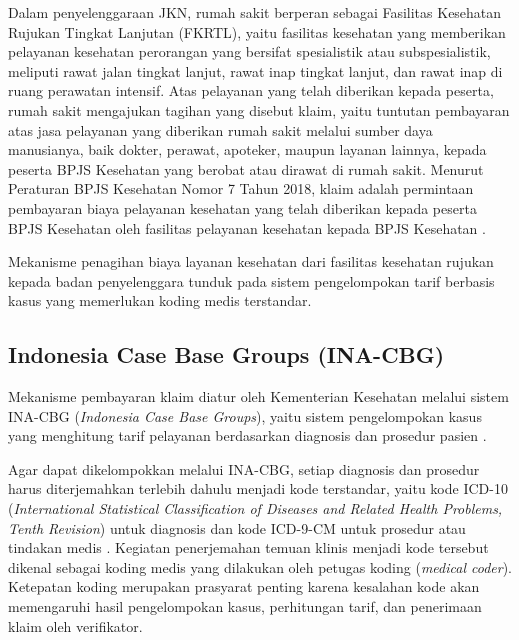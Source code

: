 Dalam penyelenggaraan JKN, rumah sakit berperan sebagai Fasilitas Kesehatan Rujukan Tingkat Lanjutan (FKRTL), yaitu fasilitas kesehatan yang memberikan pelayanan kesehatan perorangan yang bersifat spesialistik atau subspesialistik, meliputi rawat jalan tingkat lanjut, rawat inap tingkat lanjut, dan rawat inap di ruang perawatan intensif. Atas pelayanan yang telah diberikan kepada peserta, rumah sakit mengajukan tagihan yang disebut klaim, yaitu tuntutan pembayaran atas jasa pelayanan yang diberikan rumah sakit melalui sumber daya manusianya, baik dokter, perawat, apoteker, maupun layanan lainnya, kepada peserta BPJS Kesehatan yang berobat atau dirawat di rumah sakit. Menurut Peraturan BPJS Kesehatan Nomor 7 Tahun 2018, klaim adalah permintaan pembayaran biaya pelayanan kesehatan yang telah diberikan kepada peserta BPJS Kesehatan oleh fasilitas pelayanan kesehatan kepada BPJS Kesehatan \cite{1}.

Mekanisme penagihan biaya layanan kesehatan dari fasilitas kesehatan rujukan kepada badan penyelenggara tunduk pada sistem pengelompokan tarif berbasis kasus yang memerlukan koding medis terstandar.

\subsection{Indonesia Case Base Groups (INA-CBG)}
Mekanisme pembayaran klaim diatur oleh Kementerian Kesehatan melalui sistem INA-CBG (\textit{Indonesia Case Base Groups}), yaitu sistem pengelompokan kasus yang menghitung tarif pelayanan berdasarkan diagnosis dan prosedur pasien \cite{12}.

Agar dapat dikelompokkan melalui INA-CBG, setiap diagnosis dan prosedur harus diterjemahkan terlebih dahulu menjadi kode terstandar, yaitu kode ICD-10 (\textit{International Statistical Classification of Diseases and Related Health Problems, Tenth Revision}) untuk diagnosis dan kode ICD-9-CM untuk prosedur atau tindakan medis \cite{24}. Kegiatan penerjemahan temuan klinis menjadi kode tersebut dikenal sebagai koding medis yang dilakukan oleh petugas koding (\textit{medical coder}). Ketepatan koding merupakan prasyarat penting karena kesalahan kode akan memengaruhi hasil pengelompokan kasus, perhitungan tarif, dan penerimaan klaim oleh verifikator.

